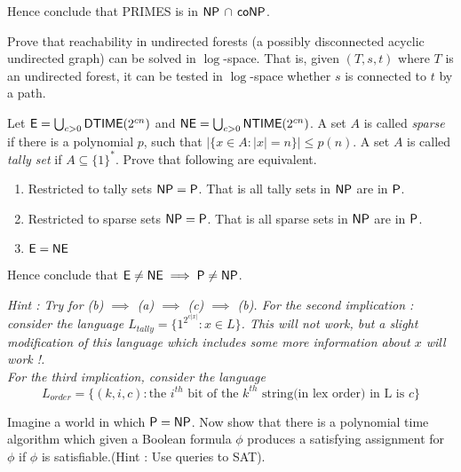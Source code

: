 \documentclass[addpoints,12pt]{exam}
\begin{document}
\begin{questions}
Hence conclude that PRIMES is in $\NP$ $\cap$ $\co\NP$.


\question[10] Prove that reachability in undirected forests (a possibly disconnected acyclic undirected graph) can be solved in $\log$-space. That is, given $(T,s,t)$ where $T$ is an undirected forest, it can be tested in $\log$-space whether $s$ is connected to $t$ by a path.

\question[18]
Let $\E = \bigcup_{c > 0} \DTIME(2^{cn})$ and $\NE = \bigcup_{c > 0} \NTIME(2^{cn})$. A set $A$ is called {\em sparse} if there is a polynomial $p$,
    such that $|\{ x \in A : |x| = n \}| \le p(n)$. A set $A$ is called
    {\em tally set} if $A \subseteq \{1\}^*$.  Prove that following
    are equivalent.
  \begin{enumerate}
  \item Restricted to tally sets $\NP = \P$. That is all tally sets in $\NP$ are in $\P$.
  \item Restricted to sparse sets $\NP = \P$. That is all sparse sets
    in $\NP$ are in $\P$.
  \item $\E = \NE$
  \end{enumerate}
  Hence conclude that $\E \ne \NE \implies \P \ne \NP$.
  
  \emph{Hint : Try for (b) $\implies$ (a) $\implies$ (c) $\implies$ (b). 
  For the second implication : consider the language $L_{tally} = \{1^{2^{c|x|}} : x \in L\}$.
  This will not work, but a slight modification of this language which includes some more information about 
  $x$ will work !. \\ For the third implication, consider the language 
\[ L_{order} = \{(k,i,c): \textrm{the $i^{th}$ bit of the $k^{th}$ string(in lex order) in L is $c$} \} \] }

\question[7] 
Imagine a world in which $\P = \NP$. Now show that there is a
polynomial time algorithm which given a Boolean formula $\phi$ produces a satisfying assignment for $\phi$ if $\phi$ is satisfiable.(Hint : Use queries to SAT).

\end{questions}
\end{document}
